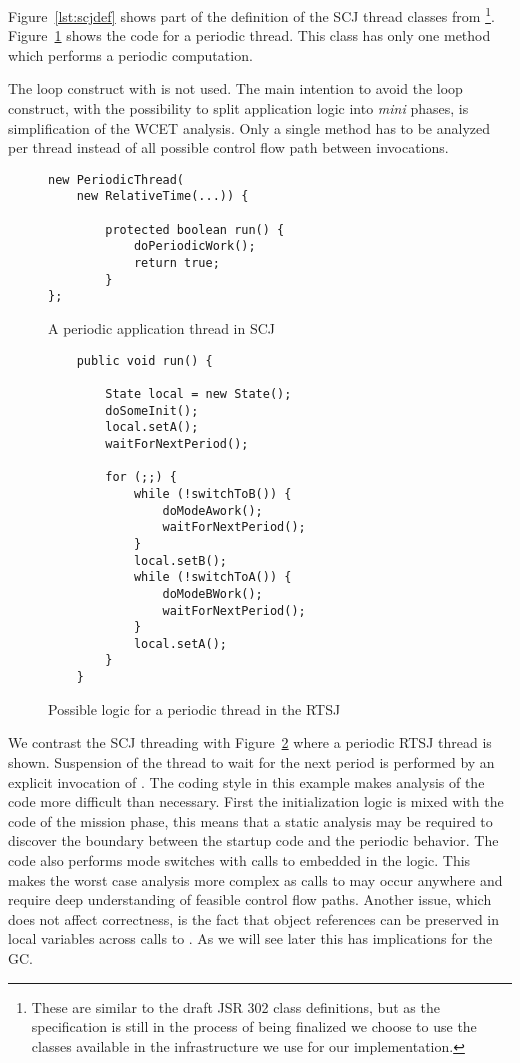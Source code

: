 Figure~\ref{lst:scjdef} shows part of the definition of the SCJ
thread classes from \cite{jop:scjava}\footnote{These are similar to
the draft JSR
  302 class definitions, but as the specification is still in the process of
  being finalized we choose to use the classes available in the
  infrastructure we use for our implementation.}. Figure~\ref{lst:per} shows
the code for a periodic thread. This class has only one 
method which performs a periodic computation.

The loop construct with  is not used. The main
intention to avoid the loop construct, with the possibility to split
application logic into \emph{mini} phases, is simplification of the
WCET analysis. Only a single method has to be analyzed per thread
instead of all possible control flow path between 
invocations.

\begin{figure}[!t]
{\small
\begin{verbatim}
new PeriodicThread(
    new RelativeTime(...)) {

        protected boolean run() {
            doPeriodicWork();
            return true;
        }
};
\end{verbatim} }
    \caption{A periodic application thread in SCJ}
    \label{lst:per}
\end{figure}

\begin{figure}[!t]
{\small
\begin{verbatim}
    public void run() {

        State local = new State();
        doSomeInit();
        local.setA();
        waitForNextPeriod();

        for (;;) {
            while (!switchToB()) {
                doModeAwork();
                waitForNextPeriod();
            }
            local.setB();
            while (!switchToA()) {
                doModeBWork();
                waitForNextPeriod();
            }
            local.setA();
        }
    }
\end{verbatim} }
    \caption{Possible logic for a periodic thread in the RTSJ}\label{lst:rtsj:per}
\end{figure}


We contrast the SCJ threading with Figure~\ref{lst:rtsj:per} where a
periodic RTSJ thread is shown. Suspension of the thread to wait for
the next period is performed by an explicit invocation of
. The coding style in this example makes analysis of
the code more difficult than necessary. First the initialization
logic is mixed with the code of the mission phase, this means that a
static analysis may be required to discover the boundary between the
startup code and the periodic behavior. The code also performs mode
switches with calls to  embedded in the logic. This
makes the worst case analysis more complex as calls to 
may occur anywhere and require deep understanding of feasible
control flow paths.  Another issue, which does not affect
correctness, is the fact that object references can be preserved in
local variables across calls to . As we will see later
this has implications for the GC.
